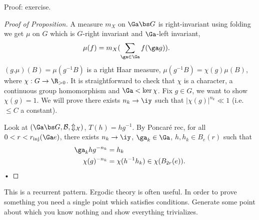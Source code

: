 Proof: exercise.
\begin{proof}[Proof of Proposition]
A measure $m_X$ on $\Ga\bs G$ is right-invariant using folding we get $\mu$ on $G$ which is $G$-right invariant and $\Ga$-left invariant,
\begin{align}
\mu(f) &= m_X(\sum_{\ga\in \Ga}  f(\ga g)).
\end{align}
$(g.\mu)(B) = \mu(g^{-1}B)$ is a right Haar measure, $\mu(g^{-1}B)=\chi(g) \mu(B)$, where $\chi:G\to \R_{>0}$. It is straightforward to check that $\chi$ is a character, a continuous group homomorphism and $\Ga < \ker \chi$. Fix $g\in G$, we want to show $\chi(g)=1$. %
We will prove there exists $n_k\to \iy$ such that $|\chi(g)|^{n_k}\ll 1$ (i.e. $\le C$ a constant). 

Look at $(\Ga \bs G, \cal B, m_X)$, $T(h)=hg^{-1}$. By Poncar\'e rec, for all $0<r<r_{\text{inj}}(\Ga e)$, there exists $n_k\to \iy$, $\ga_k\in \Ga$, $h,h_k\in B_e(r)$ such that 
\begin{align}
\ga_k h g^{-n_k} &= h_k\\
\chi(g)^{-n_k} &= \chi(h^{-1} h_k) \in \chi(B_{2r}(e)).
\end{align}•
\end{proof}
This is a recurrent pattern. Ergodic theory is often useful. In order to prove something you need a single point which satisfies conditions. Generate some point about which you know nothing and show everything trivializes.